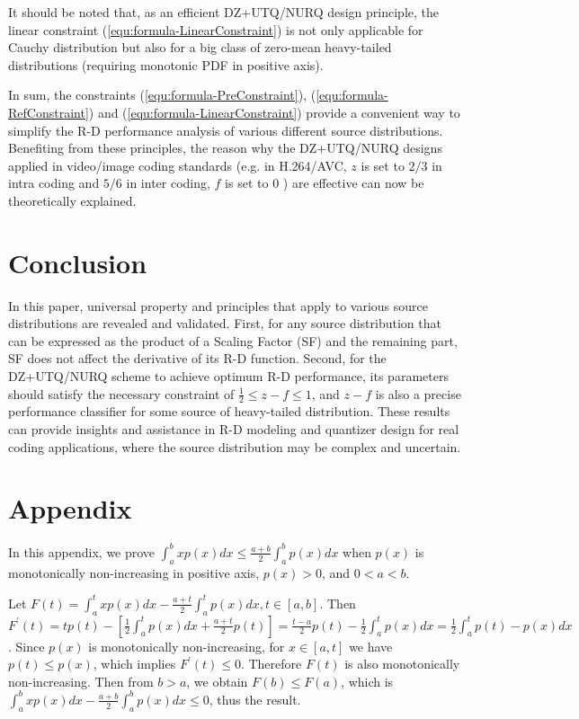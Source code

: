 \documentclass[smallabstract,smallcaptions]{dccpaper}
\begin{document}
It should be noted that, as an efficient DZ+UTQ/NURQ design principle, the linear constraint (\ref{equ:formula-LinearConstraint}) is not only applicable for Cauchy distribution but also for a big class of zero-mean heavy-tailed distributions (requiring monotonic PDF in positive axis).

In sum, the constraints (\ref{equ:formula-PreConstraint}), (\ref{equ:formula-RefConstraint}) and (\ref{equ:formula-LinearConstraint}) provide a convenient way to simplify the R-D performance analysis of various different source distributions. Benefiting from these principles, the reason why the DZ+UTQ/NURQ designs applied in video/image coding standards (e.g. in H.264/AVC, $z$ is set to $2/3$ in intra coding and $5/6$ in inter coding, $f$ is set to $0$ \cite{Sullivan_VCIP2005}) are effective can now be theoretically explained.

\section{Conclusion}
\label{sec:conclusion}

In this paper, universal property and principles that apply to various source distributions are revealed and validated. First, for any source distribution that can be expressed as the product of a Scaling Factor (SF) and the remaining part, SF does not affect the derivative of its R-D function. Second, for the DZ+UTQ/NURQ scheme to achieve optimum R-D performance, its parameters should satisfy the necessary constraint of $\frac{1}{2} \le z - f \le 1$, and $z - f$ is also a precise performance classifier for some source of heavy-tailed distribution. These results can provide insights and assistance in R-D modeling and quantizer design for real coding applications, where the source distribution may be complex and uncertain.

\section*{Appendix}
\label{sec:appendix}

In this appendix, we prove $\int_a^b xp(x)dx \le \frac{a+b}{2} \int_a^b p(x)dx$ when $p(x)$ is monotonically non-increasing in positive axis, $p(x) > 0$, and $0 < a < b$.

Let $F(t) = \int_a^t xp(x)dx - \frac{a+t}{2} \int_a^t p(x)dx, t \in [a, b]$. Then $F^{\prime}(t) = tp(t) - [\frac{1}{2}\int_a^t p(x)dx + \frac{a+t}{2}p(t)] = \frac{t-a}{2}p(t) - \frac{1}{2}\int_a^t p(x)dx = \frac{1}{2}\int_a^t p(t)-p(x)dx $. Since $p(x)$ is monotonically non-increasing, for $x \in [a, t]$ we have $p(t) \le p(x)$, which implies $F^{\prime}(t) \le 0$. Therefore $F(t)$ is also monotonically non-increasing. Then from $b > a$, we obtain $F(b) \le F(a)$, which is $\int_a^b xp(x)dx - \frac{a+b}{2} \int_a^b p(x)dx \le 0$, thus the result.
\end{document}
